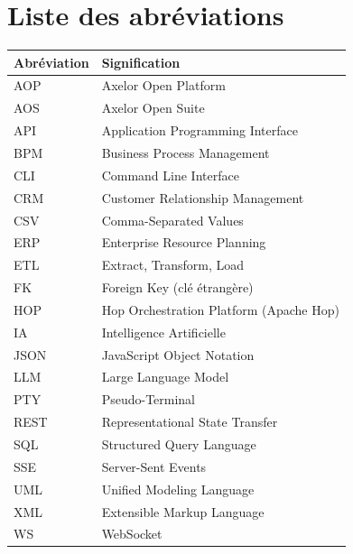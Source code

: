 \chapter*{Liste des abréviations}

\begin{table}[H]
  \centering
  \renewcommand{\arraystretch}{1.4}
  \begin{tabular}{p{3cm} p{10cm}}
    \toprule
    \rowcolor{gray!20}
    \textbf{Abréviation} & \textbf{Signification} \\
    \midrule
    \rowcolor{gray!5}
    AOP     & Axelor Open Platform \\
    AOS     & Axelor Open Suite \\
    \rowcolor{gray!5}
    API     & Application Programming Interface \\
    BPM     & Business Process Management \\
    \rowcolor{gray!5}
    CLI     & Command Line Interface \\
    CRM     & Customer Relationship Management \\
    \rowcolor{gray!5}
    CSV     & Comma-Separated Values \\
    ERP     & Enterprise Resource Planning \\
    \rowcolor{gray!5}
    ETL     & Extract, Transform, Load \\
    FK      & Foreign Key (clé étrangère) \\
    \rowcolor{gray!5}
    HOP     & Hop Orchestration Platform (Apache Hop) \\
    IA      & Intelligence Artificielle \\
    \rowcolor{gray!5}
    JSON    & JavaScript Object Notation \\
    LLM     & Large Language Model \\
    \rowcolor{gray!5}
    PTY     & Pseudo-Terminal \\
    REST    & Representational State Transfer \\
    \rowcolor{gray!5}
    SQL     & Structured Query Language \\
    SSE     & Server-Sent Events \\
    \rowcolor{gray!5}
    UML     & Unified Modeling Language \\
    XML     & Extensible Markup Language \\
    \rowcolor{gray!5}
    WS      & WebSocket \\
    \bottomrule
  \end{tabular}
\end{table}
